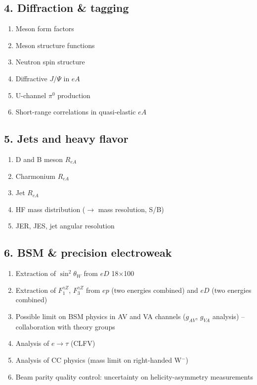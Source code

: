 \documentclass{report}
\begin{document}
\subsection{4. Diffraction \& tagging}
\begin{enumerate}
    \item Meson form factors
    \item Meson structure functions
    \item Neutron spin structure
    \item Diffractive $J/\Psi$ in $eA$
    \item U-channel $\pi^0$ production
    \item Short-range correlations in quasi-elastic $eA$
\end{enumerate}
\subsection{5. Jets and heavy flavor}
\begin{enumerate}
    \item D and B meson $R_{eA}$
    \item Charmonium $R_{eA}$
    \item Jet $R_{eA}$
    \item HF mass distribution ($\to$ mass resolution, S/B)
    \item JER, JES, jet angular resolution
\end{enumerate}

\subsection{6. BSM \& precision electroweak}
\begin{enumerate}
    \item Extraction of $\sin^2{\theta_W}$ from $eD$ 18$\times$100
    \item Extraction of $F_1^{\gamma Z}$, $F_3^{\gamma Z}$ from $ep$ (two energies combined) and $eD$ (two energies combined)
    \item Possible limit on BSM physics in AV and VA channels ($g_{AV}$, $g_{VA}$ analysis) -- collaboration with theory groups
    \item Analysis of $e\to\tau$ (CLFV)
    \item Analysis of CC physics (mass limit on right-handed W$^-$)
    \item Beam parity quality control: uncertainty on helicity-asymmetry measurements
\end{enumerate}
%
\end{document}
